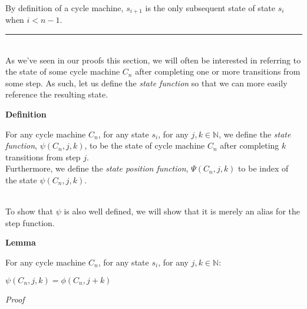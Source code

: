 \documentclass[a4paper,12pt]{article}
\begin{document}
\noindent By definition of a cycle machine, $s_{i+1}$ is the only subsequent state of state $s_i$ when $i < n - 1$.

\begin{center}
\noindent\rule{8cm}{0.4pt}
\end{center}




\noindent \\
As we've seen in our proofs this section, we will often be interested in referring to the state of some cycle machine $C_n$ after completing one or more transitions from some step. As such, let us define the \textit{state function} so that we can more easily reference the resulting state.\\






\label{definition:state_function}
\hypertarget{definition:state_function}{}
\begin{tcolorbox}
\textbf{Definition}

\noindent For any cycle machine $C_n$, for any state $s_i$, for any $j, k \in \mathbb{N}$, we define the \textit{state function}, $\psi(C_n, j, k)$, to be the state of cycle machine $C_n$ after completing $k$ transitions from step $j$.\\

\noindent Furthermore, we define the \textit{state position function}, $\Psi(C_n, j, k)$ to be index of the state $\psi(C_n, j, k)$.
\end{tcolorbox}




\noindent \\ To show that $\psi$ is also well defined, we will show that it is merely an alias for the step function.\\





\label{lemma:psi_well_defined}
\hypertarget{lemma:psi_well_defined}{}
\begin{tcolorbox}
\textbf{Lemma}

\noindent For any cycle machine $C_n$, for any state $s_i$, for any $j, k \in \mathbb{N}$:

\begin{center}
$\psi(C_n, j, k) = \phi(C_n, j + k)$
\end{center}

\end{tcolorbox}


\noindent
\textit{Proof}
\end{document}
